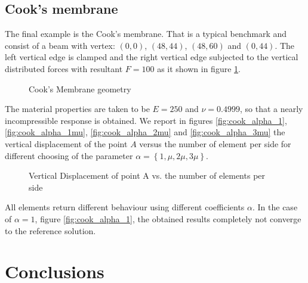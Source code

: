 \documentclass[preprint,12pt,authoryear]{elsarticle}
\begin{document}
\subsection{Cook's membrane}
The final example is the Cook's membrane. That is a typical benchmark and consist of a beam with vertex: $(0,0)$, $(48,44)$, $(48,60)$ and $(0,44)$.
The left vertical edge is clamped and the right vertical edge subjected to the vertical distributed forces with resultant $F=100$ as it shown in figure \ref{fig:cook}.
%
\begin{figure}[h!]
\begin{center}

\caption{Cook's Membrane geometry \label{fig:cook}}
\end{center}
\end{figure}
The material properties are taken to be $E = 250$ and $\nu = 0.4999$, so that a nearly incompressible response is obtained.
We report in figures \ref{fig:cook_alpha_1}, \ref{fig:cook_alpha_1mu}, \ref{fig:cook_alpha_2mu} and \ref{fig:cook_alpha_3mu} the vertical displacement of the point $A$ versus the number of element per side for different choosing of the parameter $\alpha=\left\lbrace 1, \mu, 2\mu, 3\mu \right\rbrace$.
\begin{figure}[h!]
\begin{center}
\subfigure[$\alpha=1$ \label{fig:cook_alpha_1}]
{}
\subfigure[$\alpha/ \mu=1$ \label{fig:cook_alpha_1mu}]
{}
\subfigure[$\alpha/ \mu=2$ \label{fig:cook_alpha_2mu}]
{}
\subfigure[$\alpha/ \mu=3$ \label{fig:cook_alpha_3mu}]
{}
\caption{Vertical Displacement of point A vs. 
the number of elements per side}
\end{center}
\end{figure}
All elements return different behaviour using different coefficients $\alpha$. In the case of $\alpha=1$, figure \ref{fig:cook_alpha_1}, the obtained results completely not converge to the reference solution.


\section{Conclusions}


\end{document}
